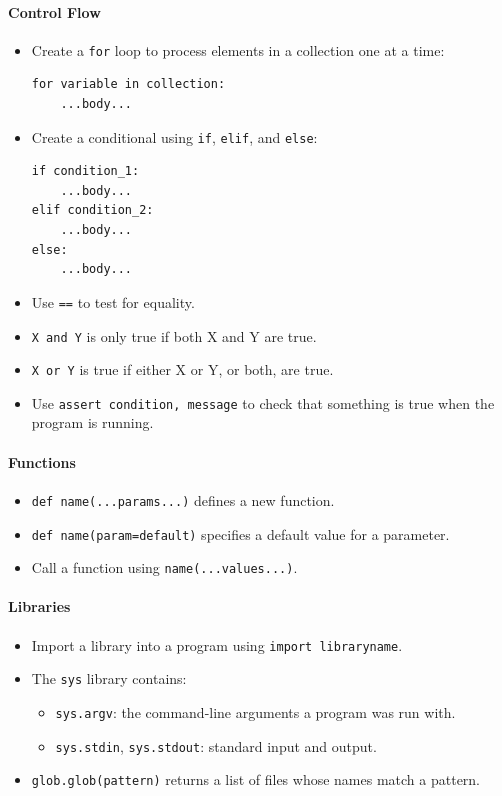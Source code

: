 \documentclass[]{book}
\begin{document}
\mbox{}\paragraph{Control Flow}

\begin{itemize}
\item
  Create a \texttt{for} loop to process elements in a collection one at
  a time:

\begin{verbatim}
for variable in collection:
    ...body...
\end{verbatim}
\item
  Create a conditional using \texttt{if}, \texttt{elif}, and
  \texttt{else}:

\begin{verbatim}
if condition_1:
    ...body...
elif condition_2:
    ...body...
else:
    ...body...
\end{verbatim}
\item
  Use \texttt{==} to test for equality.
\item
  \texttt{X and Y} is only true if both X and Y are true.
\item
  \texttt{X or Y} is true if either X or Y, or both, are true.
\item
  Use \texttt{assert condition, message} to check that something is true
  when the program is running.
\end{itemize}

\mbox{}\paragraph{Functions}

\begin{itemize}
\item
  \texttt{def name(...params...)} defines a new function.
\item
  \texttt{def name(param=default)} specifies a default value for a
  parameter.
\item
  Call a function using \texttt{name(...values...)}.
\end{itemize}

\mbox{}\paragraph{Libraries}

\begin{itemize}
\item
  Import a library into a program using \texttt{import libraryname}.
\item
  The \texttt{sys} library contains:

  \begin{itemize}
  \item
    \texttt{sys.argv}: the command-line arguments a program was run
    with.
  \item
    \texttt{sys.stdin}, \texttt{sys.stdout}: standard input and output.
  \end{itemize}
\item
  \texttt{glob.glob(pattern)} returns a list of files whose names match
  a pattern.
\end{itemize}
\end{document}
